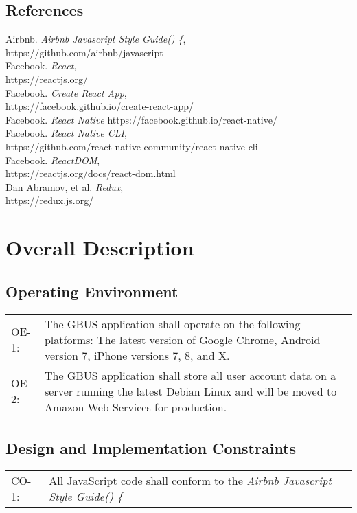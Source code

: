 \documentclass{scrreprt}
\begin{document}
\section{References}
Airbnb. \textit{Airbnb Javascript Style Guide() \{}, \\
https://github.com/airbnb/javascript\\
Facebook. \textit{React}, \\
https://reactjs.org/\\
Facebook. \textit{Create React App}, \\
https://facebook.github.io/create-react-app/\\
Facebook. \textit{React Native}
https://facebook.github.io/react-native/\\
Facebook. \textit{React Native CLI}, \\
https://github.com/react-native-community/react-native-cli\\
Facebook. \textit{ReactDOM}, \\
https://reactjs.org/docs/react-dom.html\\
Dan Abramov, et al. \textit{Redux}, \\
https://redux.js.org/\\

\chapter{Overall Description}

\section{Operating Environment}
\begin{center}
\begin{longtable}{ p{1cm} p{14cm} }
OE-1: & The GBUS application shall operate on the following platforms: The latest version of Google Chrome, Android version 7, iPhone versions 7, 8, and X. \\
OE-2: & The GBUS application shall store all user account data on a server running the latest Debian Linux and will be moved to Amazon Web Services for production. \\
\end{longtable}
\end{center}

\section{Design and Implementation Constraints}
\begin{center}
\begin{longtable}{ p{2cm} p{13cm} }
CO-1: & All JavaScript code shall conform to the \textit{Airbnb Javascript Style Guide() \{} \\
\end{longtable}
\end{center}
\end{document}
